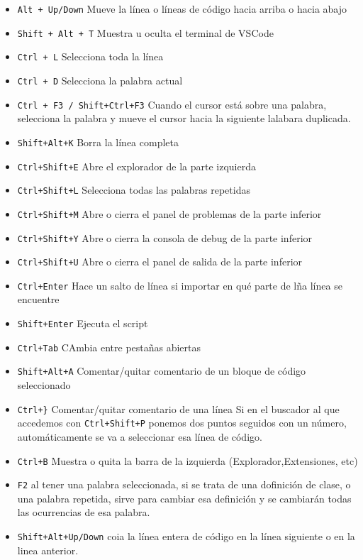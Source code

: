 \begin{itemize}
    \item \texttt{Alt + Up/Down} Mueve la línea o líneas de código hacia arriba o hacia abajo 
    \item \texttt{Shift + Alt + T} Muestra u oculta el terminal de VSCode
    \item \texttt{Ctrl + L} Selecciona toda la línea
    \item \texttt{Ctrl + D} Selecciona la palabra actual
    \item \texttt{Ctrl + F3 / Shift+Ctrl+F3} Cuando el cursor está sobre una palabra, selecciona la palabra y mueve el cursor hacia la siguiente lalabara duplicada.
    \item \texttt{Shift+Alt+K} Borra la línea completa
    \item \texttt{Ctrl+Shift+E} Abre el explorador de la parte izquierda
    \item \texttt{Ctrl+Shift+L} Selecciona todas las palabras repetidas
    \item \texttt{Ctrl+Shift+M} Abre o cierra el panel de problemas de la parte inferior
    \item \texttt{Ctrl+Shift+Y} Abre o cierra la consola de debug de la parte inferior
    \item \texttt{Ctrl+Shift+U} Abre o cierra el panel de salida de la parte inferior
    \item \texttt{Ctrl+Enter} Hace un salto de línea si importar en qué parte de lña línea se encuentre
    \item \texttt{Shift+Enter} Ejecuta el script
    \item \texttt{Ctrl+Tab} CAmbia entre pestañas abiertas
    \item \texttt{Shift+Alt+A} Comentar/quitar comentario de un bloque de código seleccionado
    \item \texttt{Ctrl+\}} Comentar/quitar comentario de una línea
    Si en el buscador al que accedemos con \texttt{Ctrl+Shift+P} ponemos dos puntos seguidos con un número, automáticamente se va a seleccionar esa línea de código.
    \item \texttt{Ctrl+B} Muestra o quita la barra de la izquierda (Explorador,Extensiones, etc)
    \item \texttt{F2} al tener una palabra seleccionada, si se trata de una dofinición de clase, o una palabra repetida, sirve para cambiar esa definición y se cambiarán todas las ocurrencias de esa palabra.
    \item \texttt{Shift+Alt+Up/Down} coia la línea entera de código en la línea siguiente o en la linea anterior.
\end{itemize}

